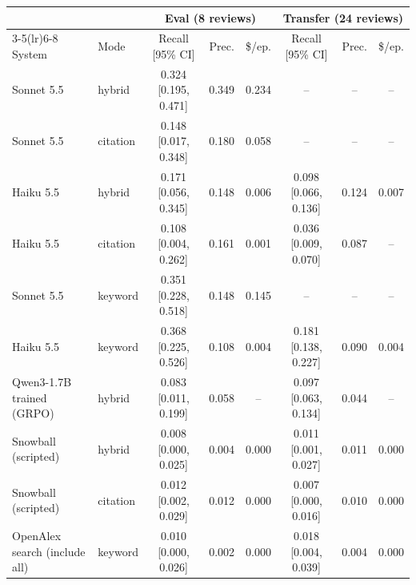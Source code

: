 \begin{tabular}{llcccccc}
\toprule
 & & \multicolumn{3}{c}{Eval (8 reviews)} & \multicolumn{3}{c}{Transfer (24 reviews)} \\
\cmidrule(lr){3-5}\cmidrule(lr){6-8}
System & Mode & Recall [95\% CI] & Prec. & \$/ep. & Recall [95\% CI] & Prec. & \$/ep. \\
\midrule
Sonnet 5.5 & hybrid & 0.324 [0.195, 0.471] & 0.349 & 0.234 & -- & -- & -- \\
Sonnet 5.5 & citation & 0.148 [0.017, 0.348] & 0.180 & 0.058 & -- & -- & -- \\
Haiku 5.5 & hybrid & 0.171 [0.056, 0.345] & 0.148 & 0.006 & 0.098 [0.066, 0.136] & 0.124 & 0.007 \\
Haiku 5.5 & citation & 0.108 [0.004, 0.262] & 0.161 & 0.001 & 0.036 [0.009, 0.070] & 0.087 & -- \\
Sonnet 5.5 & keyword & 0.351 [0.228, 0.518] & 0.148 & 0.145 & -- & -- & -- \\
Haiku 5.5 & keyword & 0.368 [0.225, 0.526] & 0.108 & 0.004 & 0.181 [0.138, 0.227] & 0.090 & 0.004 \\
Qwen3-1.7B trained (GRPO) & hybrid & 0.083 [0.011, 0.199] & 0.058 & -- & 0.097 [0.063, 0.134] & 0.044 & -- \\
Snowball (scripted) & hybrid & 0.008 [0.000, 0.025] & 0.004 & 0.000 & 0.011 [0.001, 0.027] & 0.011 & 0.000 \\
Snowball (scripted) & citation & 0.012 [0.002, 0.029] & 0.012 & 0.000 & 0.007 [0.000, 0.016] & 0.010 & 0.000 \\
OpenAlex search (include all) & keyword & 0.010 [0.000, 0.026] & 0.002 & 0.000 & 0.018 [0.004, 0.039] & 0.004 & 0.000 \\
\bottomrule
\end{tabular}
